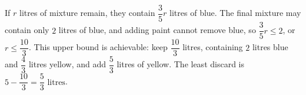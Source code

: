 If $r$ litres of mixture remain, they contain $\dfrac{3}{5}r$ litres of blue. The final mixture may contain only $2$ litres of blue, and adding paint cannot remove blue, so $\dfrac{3}{5}r\le2$, or $r\le\dfrac{10}{3}$. This upper bound is achievable: keep $\dfrac{10}{3}$ litres, containing $2$ litres blue and $\dfrac{4}{3}$ litres yellow, and add $\dfrac{5}{3}$ litres of yellow. The least discard is $5-\dfrac{10}{3}=\boxed{\dfrac{5}{3}\text{ litres}}$.
